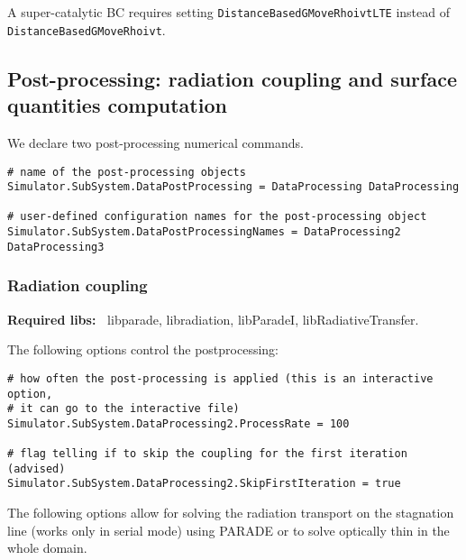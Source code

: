 \documentclass[11pt]{article}
\begin{document}
A super-catalytic BC requires setting {\tt DistanceBasedGMoveRhoivtLTE} instead of  
{\tt DistanceBasedGMoveRhoivt}.

\subsection{Post-processing: radiation coupling and surface quantities computation}

We declare two post-processing numerical commands.

\begin{verbatim}
# name of the post-processing objects
Simulator.SubSystem.DataPostProcessing = DataProcessing DataProcessing

# user-defined configuration names for the post-processing object 
Simulator.SubSystem.DataPostProcessingNames = DataProcessing2 DataProcessing3
\end{verbatim}

\subsubsection{Radiation coupling}

{\bf Required libs:~} libparade, libradiation, libParadeI, libRadiativeTransfer.

The following options control the postprocessing:

\begin{verbatim}
# how often the post-processing is applied (this is an interactive option, 
# it can go to the interactive file)
Simulator.SubSystem.DataProcessing2.ProcessRate = 100

# flag telling if to skip the coupling for the first iteration (advised)
Simulator.SubSystem.DataProcessing2.SkipFirstIteration = true
\end{verbatim}

The following options allow for solving the radiation transport on the stagnation line (works only in serial mode) 
using PARADE or to solve optically thin in the whole domain.
\end{document}
